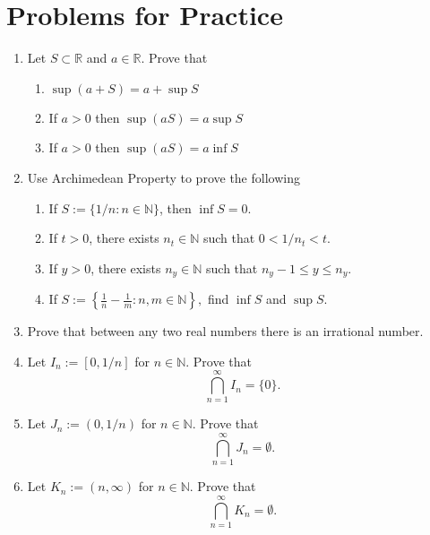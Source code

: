 \documentclass[12pt]{article}
\begin{document}
\newpage

\section{Problems for Practice}

\begin{enumerate}
    \item Let $S\subset\mathbb{R}$ and $a\in\mathbb{R}$. Prove that
    \begin{enumerate}
        \item $\sup (a+S)=a+\sup S$
        \item If $a>0$ then $\sup (aS)=a\sup S$
        \item If $a>0$ then $\sup (aS)=a\inf S$
    \end{enumerate}
    \item Use Archimedean Property to prove the following
    \begin{enumerate}
        \item If $S := \{1/n : n \in \mathbb{N}\}$, then $\inf S = 0$.
        \item If $t > 0$, there exists $n_t \in \mathbb{N}$ such that $0 < 1/n_t < t$.
        \item If $y > 0$, there exists $n_y \in \mathbb{N}$ such that $n_y - 1 \leq y \leq n_y$.
        \item If \( S := \left\{ \frac{1}{n} - \frac{1}{m} : n, m \in \mathbb{N} \right\}, \) find \( \inf S \) and \( \sup S \).
    \end{enumerate}
    \item Prove that between any two real numbers there is an irrational number.
    \item Let \( I_n := [0, 1/n] \) for \( n \in \mathbb{N} \). Prove that
    \[
    \bigcap_{n=1}^{\infty} I_n = \{0\}.
    \]

    \item Let \( J_n := (0, 1/n) \) for \( n \in \mathbb{N} \). Prove that
    \[
    \bigcap_{n=1}^{\infty} J_n = \emptyset.
    \]

    \item Let \( K_n := (n, \infty) \) for \( n \in \mathbb{N} \). Prove that
    \[
    \bigcap_{n=1}^{\infty} K_n = \emptyset.
    \]

\end{enumerate}
\end{document}
